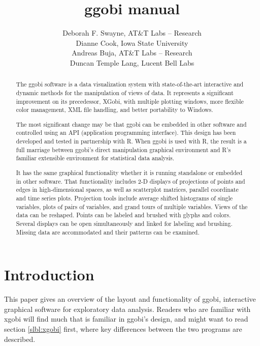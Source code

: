 \documentclass[11pt]{article}
\begin{document}
\title {ggobi manual}
\author{
Deborah F. Swayne, AT\&T Labs -- Research \\
Dianne Cook, Iowa State University \\
Andreas Buja, AT\&T Labs -- Research \\
Duncan Temple Lang, Lucent Bell Labs
}
\date{}

\maketitle

\begin{abstract}

The ggobi software is a data visualization system with state-of-the-art
interactive and dynamic methods for the manipulation of views of
data.  It represents a significant improvement on its precedessor, XGobi,
with multiple plotting windows, more flexible color management, XML file
handling, and better portability to Windows.

The most significant change may be that ggobi can be embedded in other
software and controlled using an API (application programming
interface).  This design has been developed and tested in partnership
with R.  When ggobi is used with R, the result is a full marriage
between ggobi's direct manipulation graphical environment and R's
familiar extensible environment for statistical data analysis.

It has the same graphical functionality whether it is running
standalone or embedded in other software.  That functionality
includes 2-D displays of projections of points and edges in
high-dimensional spaces, as well as scatterplot matrices, parallel
coordinate and time series plots.  Projection tools include average
shifted histograms of single variables, plots of pairs of variables,
and grand tours of multiple variables.  Views of the data can be
reshaped.  Points can be labeled and brushed with glyphs and colors.
Several displays can be open simultaneously and linked for labeling
and brushing.  Missing data are accommodated and their patterns can
be examined.
\end{abstract}

\section{Introduction}

This paper gives an overview of the layout and functionality of ggobi,
interactive graphical software for exploratory data analysis.  Readers
who are familiar with xgobi will find much that is familiar in ggobi's
design, and might want to read section \ref{slbl:xgobi} first,
where key differences between the two programs are described.
\end{document}
